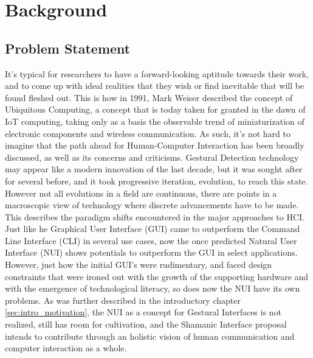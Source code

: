 \chapter{Background} \label{chap:back}
\section{Problem Statement} \label{sec:cul_problem}
    It's typical for researchers to have a forward-looking aptitude towards their work, and to come up with ideal realities that they wish or find inevitable that will be found fleshed out. This is how in 1991, Mark Weiser described the concept of Ubiquitous Computing\cite{ weiser1991}, a concept that is today taken for granted in the dawn of IoT computing, taking only as a basis the observable trend of miniaturization of electronic components and wireless communication. As such, it’s not hard to imagine that the path ahead for Human-Computer Interaction has been broadly discussed, as well as its concerns and criticisms. Gestural Detection technology may appear like a modern innovation of the last decade, but it was sought after for several before, and it took progressive iteration, evolution, to reach this state.\\
    However not all evolutions in a field are continuous, there are points in a macroscopic view of technology where discrete advancements have to be made. This describes the paradigm shifts encountered in the major approaches to HCI. Just like he Graphical User Interface (GUI) came to outperform the Command Line Interface (CLI) in several use cases, now the once predicted Natural User Interface (NUI) shows potentials to outperform the GUI in select applications.\\
    However, just how the initial GUI’s were rudimentary, and faced design constraints that were ironed out with the growth of the supporting hardware and with the emergence of technological literacy, so does now the NUI have its own problems. As was further described in the introductory chapter \ref{sec:intro_motivation}, the NUI as a concept for Gestural Interfaces is not realized, still has room for cultivation, and the Shamanic Interface proposal intends to contribute through an holistic vision of human communication and computer interaction as a whole.

